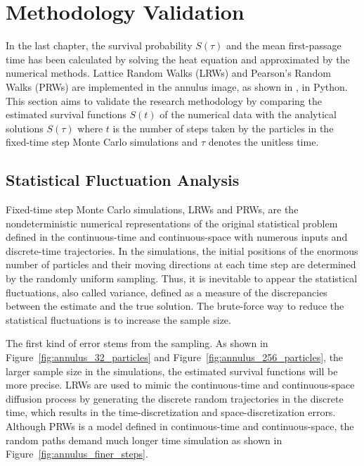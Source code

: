 \section{Methodology Validation}

In the last chapter, the survival probability $S(\tau)$ and the mean
first-passage time has been calculated by solving the heat equation
and approximated by the numerical methods. Lattice Random Walks (LRWs)
and Pearson's Random Walks (PRWs) are implemented in the annulus
image, as shown in , in Python. This section aims to validate the
research methodology by comparing the estimated survival functions
$S(t)$ of the numerical data with the analytical solutions $S(\tau)$
where $t$ is the number of steps taken by the particles in the
fixed-time step Monte Carlo simulations and $\tau$ denotes the
unitless time.


\subsection{Statistical Fluctuation Analysis}

Fixed-time step Monte Carlo simulations, LRWs and PRWs, are the
nondeterministic numerical representations of the original statistical
problem defined in the continuous-time and continuous-space with
numerous inputs and discrete-time trajectories. In the simulations,
the initial positions of the enormous number of particles and their
moving directions at each time step are determined by the randomly
uniform sampling. Thus, it is inevitable to appear the statistical
fluctuations, also called variance, defined as a measure of the
discrepancies between the estimate and the true solution. The
brute-force way to reduce the statistical fluctuations is to increase
the sample size.


The first kind of error stems from the sampling. As shown in
Figure~\ref{fig:annulus_32_particles} and
Figure~\ref{fig:annulus_256_particles}, the larger sample size in the
simulations, the estimated survival functions will be more
precise. LRWs are used to mimic the continuous-time and
continuous-space diffusion process by generating the discrete random
trajectories in the discrete time, which results in the
time-discretization and space-discretization errors. Although PRWs is
a model defined in continuous-time and continuous-space, the random
paths demand much longer time simulation as shown in
Figure~\ref{fig:annulus_finer_steps}.


